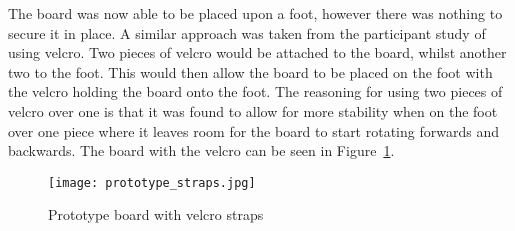 The board was now able to be placed upon a foot, however there was nothing to secure it in place. A similar approach was taken from the participant study of using velcro. Two pieces of velcro would be attached to the board, whilst another two to the foot. This would then allow the board to be placed on the foot with the velcro holding the board onto the foot. The reasoning for using two pieces of velcro over one is that it was found to allow for more stability when on the foot over one piece where it leaves room for the board to start rotating forwards and backwards. The board with the velcro can be seen in Figure~\ref{fig:board:velcro}.

\begin{figure}
	\centering
	\texttt{[image: prototype\_straps.jpg]}
	\caption{Prototype board with velcro straps}
	\label{fig:board:velcro}
\end{figure}